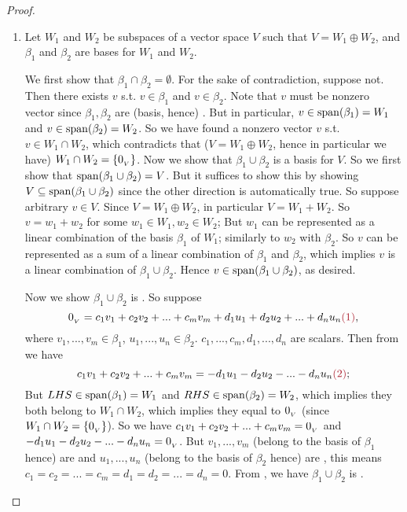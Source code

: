\begin{proof} \ 
\begin{enumerate}
\item
Let \(W_1\) and \(W_2\) be subspaces of a vector space \(V\) such that \(V = W_1 \oplus W_2\), and \(\beta_1\) and \(\beta_2\) are bases for \(W_1\) and \(W_2\).

We first show that \(\beta_1 \cap \beta_2 = \emptyset\).
For the sake of contradiction, suppose not.
Then there exists \(v\) s.t. \(v \in \beta_1\) and \(v \in \beta_2\).
Note that \(v\) must be nonzero vector since \(\beta_1, \beta_2\) are (basis, hence) \LID{}.
But in particular, \(v \in \operatorname{span}(\beta_1) = W_1\) and \(v \in \operatorname{span}(\beta_2) = W_2\).
So we have found a nonzero vector \(v\) s.t. \(v \in W_1 \cap W_2\), which contradicts that (\(V = W_1 \oplus W_2\), hence in particular we have) \(W_1 \cap W_2 = \{ 0_{_V} \}\).
Now we show that \(\beta_1 \cup \beta_2\) is a basis for \(V\).
So we first show that \(\operatorname{span}(\beta_1 \cup \beta_2) = V\).
But it suffices to show this by showing \(V \subseteq \operatorname{span}(\beta_1 \cup \beta_2)\) since the other direction is automatically true.
So suppose arbitrary \(v \in V\).
Since \(V = W_1 \oplus W_2\), in particular \(V = W_1 + W_2\).
So \(v = w_1 + w_2\) for some \(w_1 \in W_1, w_2 \in W_2\);
But \(w_1\) can be represented as a linear combination of the basis \(\beta_1\) of \(W_1\); similarly to \(w_2\) with \(\beta_2\).
So \(v\) can be represented as a sum of a linear combination of \(\beta_1\) and \(\beta_2\), which implies \(v\) is a linear combination of \(\beta_1 \cup \beta_2\).
Hence \(v \in \operatorname{span}(\beta_1 \cup \beta_2)\), as desired.

Now we show \(\beta_1 \cup \beta_2\) is \LID{}.
So suppose
\[
    \OV = c_1 v_1 + c_2 v_2 + ... + c_m v_m + d_1 u_1 + d_2 u_2 + ... + d_n u_n ,
\]
where \(v_1, ..., v_m \in \beta_1\), \(u_1, ..., u_n \in \beta_2\). \(c_1, ..., c_m, d_1, ..., d_n\) are scalars.
Then from \MAROON{(1)} we have
\[
    c_1 v_1 + c_2 v_2 + ... + c_m v_m = - d_1 u_1 - d_2 u_2 - ... - d_n u_n \MAROON{(2)};
\]
But \(LHS \in \operatorname{span}(\beta_1) = W_1\) and \(RHS \in \operatorname{span}(\beta_2) = W_2\), which implies they both belong to \(W_1 \cap W_2\), which implies they equal to \(0_{_V}\) (since \(W_1 \cap W_2 = \{ 0_{_V} \}\)).
So we have \(c_1 v_1 + c_2 v_2 + ... + c_m v_m = 0_{_V}\) and \(- d_1 u_1 - d_2 u_2 - ... - d_n u_n = 0_{_V}\).
But \(v_1, ..., v_m\) (belong to the basis of \(\beta_1\) hence) are \LID{} and \(u_1, ..., u_n\) (belong to the basis of \(\beta_2\) hence) are \LID{}, this means \(c_1 = c_2 = ... = c_m = d_1 = d_2 = ... = d_n = 0\).
From \MAROON{(1)}, we have \(\beta_1 \cup \beta_2\) is \LID{}.


\end{enumerate}
\end{proof}

